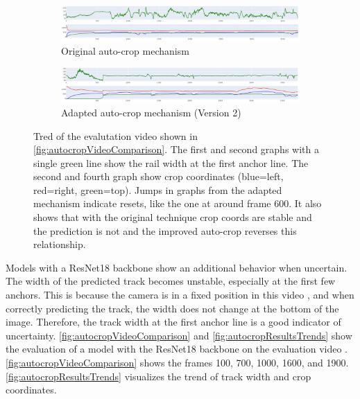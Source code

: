 \begin{figure}[H]
    \centering
    \begin{subfigure}{\textwidth}
        \centering
        \includegraphics[width=\textwidth]{PICs/experiments/autocropExperiments/original.jpg} %
        \caption{Original auto-crop mechanism}
        \label{fig:autocropResultsTrends_a}
    \end{subfigure}
    \begin{subfigure}{\textwidth}
        \centering
        \includegraphics[width=\textwidth]{PICs/experiments/autocropExperiments/improved.jpg} %
        \caption{Adapted auto-crop mechanism (Version 2)}
        \label{fig:autocropResultsTrends_b}
    \end{subfigure}
    \caption{Tred of the evalutation video \cite{temporalDataset_youtube_video} shown in \autoref{fig:autocropVideoComparison}.
    The first and second graphs with a single green line show the rail width at the first anchor line.
    The second and fourth graph show crop coordinates (blue=left, red=right, green=top).
    Jumps in graphs from the adapted mechanism indicate resets, like the one at around frame 600.
    It also shows that with the original technique crop coords are stable and the prediction is not and the improved auto-crop reverses this relationship.}
    \label{fig:autocropResultsTrends}
\end{figure}


Models with a ResNet18 backbone show an additional behavior when uncertain.
The width of the predicted track becomes unstable, especially at the first few anchors.
This is because the camera is in a fixed position in this video \cite{temporalDataset_youtube_video}, and when correctly predicting the track, the width does not change at the bottom of the image.
Therefore, the track width at the first anchor line is a good indicator of uncertainty.
\autoref{fig:autocropVideoComparison} and \autoref{fig:autocropResultsTrends} show the evaluation of a model with the ResNet18 backbone on the evaluation video \cite{temporalDataset_youtube_video}.
\autoref{fig:autocropVideoComparison} shows the frames 100, 700, 1000, 1600, and 1900.
\autoref{fig:autocropResultsTrends} visualizes the trend of track width and crop coordinates.

